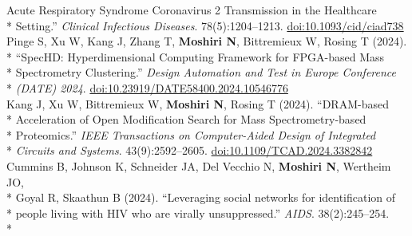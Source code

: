 \documentclass[margin,line]{res}
\begin{document}
\begin{resume}
\hspace*{9.5mm} Acute Respiratory Syndrome Coronavirus 2 Transmission in the Healthcare\\*\vspace{2mm}
\hspace*{8mm} Setting.'' \textit{Clinical Infectious Diseases}. 78(5):1204--1213. \href{https://doi.org/10.1093/cid/ciad738}{doi:10.1093/cid/ciad738}\\
\hspace*{4mm} Pinge S, Xu W, Kang J, Zhang T, \textbf{Moshiri N}, Bittremieux W, Rosing T (2024).\\*
\hspace*{9.5mm} ``SpecHD: Hyperdimensional Computing Framework for FPGA-based Mass\\*
\hspace*{9.5mm} Spectrometry Clustering.'' \textit{Design Automation and Test in Europe Conference}\\*\vspace{2mm}
\hspace*{8mm} \textit{(DATE) 2024}. \href{https://doi.org/10.23919/DATE58400.2024.10546776}{doi:10.23919/DATE58400.2024.10546776}\\
\hspace*{4mm} Kang J, Xu W, Bittremieux W, \textbf{Moshiri N}, Rosing T (2024). ``DRAM-based\\*
\hspace*{9.5mm} Acceleration of Open Modification Search for Mass Spectrometry-based\\*
\hspace*{9.5mm} Proteomics.'' \textit{IEEE Transactions on Computer-Aided Design of Integrated}\\*\vspace{2mm}
\hspace*{8mm} \textit{Circuits and Systems}. 43(9):2592--2605. \href{https://doi.org/10.1109/TCAD.2024.3382842}{doi:10.1109/TCAD.2024.3382842}\\
\hspace*{4mm} Cummins B, Johnson K, Schneider JA, Del Vecchio N, \textbf{Moshiri N}, Wertheim JO,\\*
\hspace*{9.5mm} Goyal R, Skaathun B (2024). ``Leveraging social networks for identification of\\*
\hspace*{9.5mm} people living with HIV who are virally unsuppressed.'' \textit{AIDS}. 38(2):245--254.\\*\vspace{2mm}

\end{resume}
\end{document}
